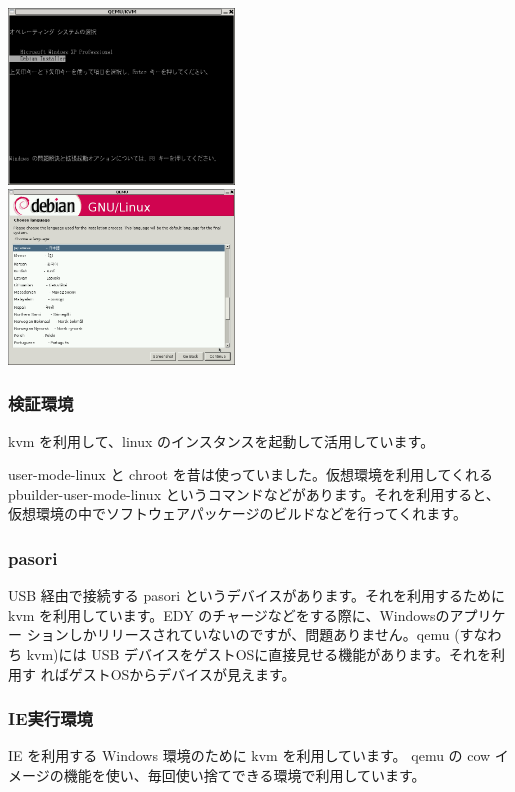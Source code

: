 \documentclass[mingoth,a4paper]{jsarticle}
\begin{document}
\includegraphics[width=6cm]{image200703/goodbyemicrosoftcom6.png}\\
\includegraphics[width=6cm]{image200703/goodbyemicrosoftcom7.png}

\subsubsection{検証環境}

kvm を利用して、linux のインスタンスを起動して活用しています。

user-mode-linux と chroot を昔は使っていました。仮想環境を利用してくれる 
pbuilder-user-mode-linux というコマンドなどがあります。それを利用すると、
仮想環境の中でソフトウェアパッケージのビルドなどを行ってくれます。

\subsubsection{pasori}

USB 経由で接続する pasori というデバイスがあります。それを利用するために 
kvm を利用しています。EDY のチャージなどをする際に、Windowsのアプリケー
ションしかリリースされていないのですが、問題ありません。qemu (すなわち
kvm)には USB デバイスをゲストOSに直接見せる機能があります。それを利用す
ればゲストOSからデバイスが見えます。

\subsubsection{IE実行環境}

IE を利用する Windows 環境のために kvm を利用しています。
qemu の cow イメージの機能を使い、毎回使い捨てできる環境で利用しています。
\end{document}
